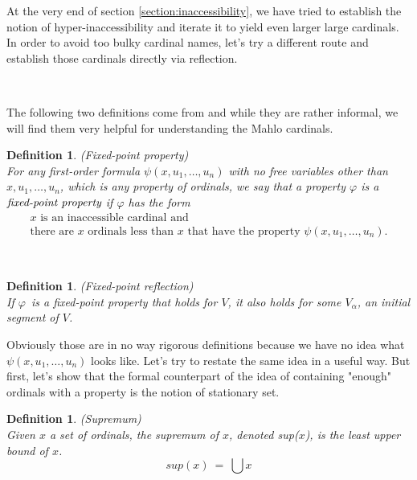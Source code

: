 \documentclass[12pt,a4paper]{article}
\newtheorem{definition}[theorem]{Definition}
\begin{document}
At the very end of section \ref{section:inaccessibility}, we have tried to establish the notion of hyper-inaccessibility and iterate it to yield even larger large cardinals. In order to avoid too bulky cardinal names, let's try a different route and establish those cardinals directly via reflection.

\

The following two definitions come from \cite{Infinity_in_mind} and while they are rather informal, we will find them very helpful for understanding the Mahlo cardinals.
\begin{definition}{(Fixed-point property)}\\
For any first-order formula $\psi(x, u_1, \ldots, u_n)$ with no free variables other than $x, u_1, \ldots, u_n$, which is any property of ordinals, we say that a property $\varphi$ is a $\emph{fixed-point property}$ if $\varphi$ has the form
\begin{equation}
\begin{gathered}
\mbox{$x$ is an inaccessible cardinal and }\\
\mbox{there are $x$ ordinals less than $x$ that have the property $\psi(x, u_1, \ldots, u_n)$.}
\end{gathered}
\end{equation}
\end{definition}

\

\begin{definition}{(Fixed-point reflection)}\\
If $\varphi$ is a fixed-point property that holds for $V$, it also holds for some $V_\alpha$, an initial segment of $V$.
\end{definition}

Obviously those are in no way rigorous definitions because we have no idea what $\psi(x, u_1, \ldots, u_n)$ looks like. Let's try to restate the same idea in a useful way. But first, let's show that the formal counterpart of the idea of containing "enough" ordinals with a property is the notion of stationary set. 

\begin{definition}{(Supremum)}\\
Given $x$ a set of ordinals, the supremum of $x$, denoted sup($x$), is the least upper bound of $x$. %
\begin{equation}
sup(x)\ =\ \bigcup x
\end{equation}
\end{definition}
\end{document}
